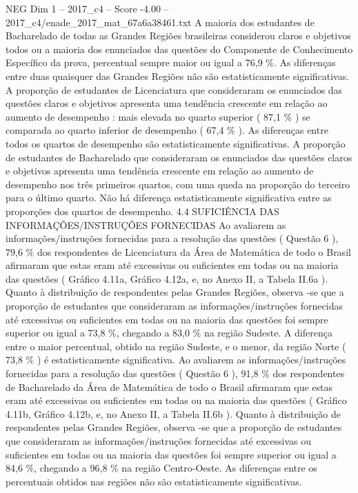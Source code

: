 \begin{textsample}{NEG Dim 1 – 2017\_c4 – Score -4.00 – 2017\_c4/enade\_2017\_mat\_67a6a38461.txt}
A maioria dos estudantes de Bacharelado de todas as Grandes Regiões brasileiras considerou claros e objetivos todos ou a maioria dos enunciados das questões do Componente de Conhecimento Específico da prova, percentual sempre maior ou igual a 76,9 \%.
As diferenças entre duas quaisquer das Grandes Regiões não são estatisticamente significativas.
A proporção de estudantes de Licenciatura que consideraram os enunciados das questões claros e objetivos apresenta uma tendência crescente em relação ao aumento de desempenho : mais elevada no quarto superior ( 87,1 \% ) se comparada ao quarto inferior de desempenho ( 67,4 \% ).
As diferenças entre todos os quartos de desempenho são estatisticamente significativas.
A proporção de estudantes de Bacharelado que consideraram os enunciados das questões claros e objetivos apresenta uma tendência crescente em relação ao aumento de desempenho nos três primeiros quartos, com uma queda na proporção do terceiro para o último quarto.
Não há diferença estatisticamente significativa entre as proporções dos quartos de desempenho. 4.4 SUFICIÊNCIA DAS INFORMAÇÕES/INSTRUÇÕES FORNECIDAS Ao avaliarem as informações/instruções fornecidas para a resolução das questões ( Questão 6 ), 79,6 \% dos respondentes de Licenciatura da Área de Matemática de todo o Brasil afirmaram que estas eram até excessivas ou suficientes em todas ou na maioria das questões ( Gráfico 4.11a, Gráfico 4.12a, e, no Anexo II, a Tabela II.6a ).
Quanto à distribuição de respondentes pelas Grandes Regiões, observa -se que a proporção de estudantes que consideraram as informações/instruções fornecidas até excessivas ou suficientes em todas ou na maioria das questões foi sempre superior ou igual a 73,8 \%, chegando a 83,0 \% na região Sudeste.
A diferença entre o maior percentual, obtido na região Sudeste, e o menor, da região Norte ( 73,8 \% ) é estatisticamente significativa.
Ao avaliarem as informações/instruções fornecidas para a resolução das questões ( Questão 6 ), 91,8 \% dos respondentes de Bacharelado da Área de Matemática de todo o Brasil afirmaram que estas eram até excessivas ou suficientes em todas ou na maioria das questões ( Gráfico 4.11b, Gráfico 4.12b, e, no Anexo II, a Tabela II.6b ).
Quanto à distribuição de respondentes pelas Grandes Regiões, observa -se que a proporção de estudantes que consideraram as informações/instruções fornecidas até excessivas ou suficientes em todas ou na maioria das questões foi sempre superior ou igual a 84,6 \%, chegando a 96,8 \% na região Centro-Oeste.
As diferenças entre os percentuais obtidos nas regiões não são estatisticamente significativas.

\end{textsample}
